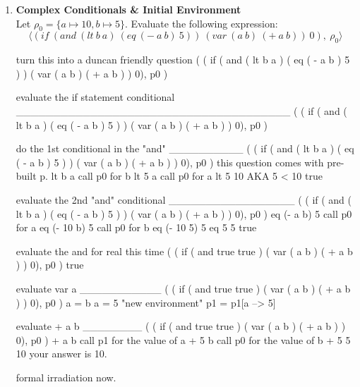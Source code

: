\documentclass[11pt]{article}
\begin{document}
\begin{enumerate}
        \item \textbf{Complex Conditionals \& Initial Environment} \\
        Let $\rho_0 = \{ a \mapsto 10, b \mapsto 5 \}$. Evaluate the following expression:
        \[
            \langle (if\ (and\ (lt\ b\ a)\ (eq\ (-\ a\ b)\ 5))\ (var\ (a\ b)\ (+\ a\ b))\ 0),\ \rho_0 \rangle
        \]

        \begin{markdown}
            turn this into a duncan friendly question
            ( ( if ( and ( lt b a ) ( eq ( - a b ) 5 ) ) ( var ( a b ) ( + a b ) ) 0), p0 )

            evaluate the if statement conditional
            _____________________________________
            ( ( if ( and ( lt b a ) ( eq ( - a b ) 5 ) ) ( var ( a b ) ( + a b ) ) 0), p0 )

            do the 1st conditional in the "and"
            __________
            ( ( if ( and ( lt b a ) ( eq ( - a b ) 5 ) ) ( var ( a b ) ( + a b ) ) 0), p0 )
            this question comes with pre-built p.
            lt b a
            call p0 for b
            lt 5 a
            call p0 for a
            lt 5 10
            AKA
            5 < 10
            true

            evaluate the 2nd "and" conditional
            _________________
            ( ( if ( and ( lt b a ) ( eq ( - a b ) 5 ) ) ( var ( a b ) ( + a b ) ) 0), p0 )
            eq (- a b) 5
            call p0 for a
            eq (- 10 b) 5
            call p0 for b
            eq (- 10 5) 5
            eq 5 5
            true

            evaluate the and for real this time
            ( ( if ( and true true ) ( var ( a b ) ( + a b ) ) 0), p0 )
            true

            evaluate var a
            ___________
            ( ( if ( and true true ) ( var ( a b ) ( + a b ) ) 0), p0 )
            a = b
            a = 5
            "new environment"
            p1 = p1[a --> 5]

            evaluate + a b
            ________
            ( ( if ( and true true ) ( var ( a b ) ( + a b ) ) 0), p0 )
            + a b
            call p1 for the value of a
            + 5 b
            call p0 for the value of b
            + 5 5
            10
            your answer is 10.

            formal irradiation now.
        \end{markdown}


\end{enumerate}
\end{document}
